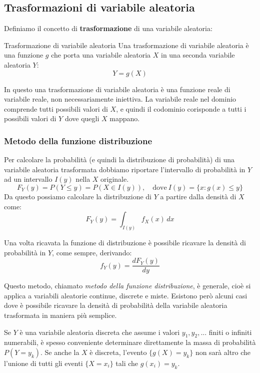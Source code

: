 \documentclass[a4paper,11pt]{article}
\begin{document}
\subsection{Trasformazioni di variabile aleatoria}
Definiamo il concetto di \textbf{trasformazione} di una variabile aleatoria:
\begin{definition}{Trasformazione di variabile aleatoria}
Una trasformazione di variabile aleatoria è una funzione $g$ che porta una variabile aleatoria $X$ in una seconda variabile aleatoria $Y$:
$$
Y = g(X)
$$
\end{definition}

In questo una trasformazione di variabile aleatoria è una funzione reale di variabile reale, non necessariamente iniettiva. La variabile reale nel dominio comprende tutti possibili valori di $X$, e quindi il codominio corisponde a tutti i possibili valori di $Y$ dove quegli $X$ mappano. 

\subsubsection{Metodo della funzione distribuzione}

Per calcolare la probabilità (e quindi la distribuzione di probabilità) di una variabile aleatoria trasformata dobbiamo riportare l'intervallo di probabilità in $Y$ ad un intervallo $I(y)$ nella $X$ originale.
$$
F_Y(y) = P(Y \leq y) = P(X \in I(y)), \quad \text{dove} \ I(y) = \{ x: g(x) \leq y \}
$$
Da questo possiamo calcolare la distribuzione di $Y$ a partire dalla densità di $X$ come:
$$
F_Y(y) = \int_{I(y)} f_X(x) \, dx
$$

Una volta ricavata la funzione di distribuzione è possibile ricavare la densità di probabilità in $Y$, come sempre, derivando:
$$
f_Y(y) = \frac{d F_Y(y)}{dy}
$$

Questo metodo, chiamato \textit{metodo della funzione distribuzione}, è generale, cioè si applica a variabili aleatorie continue, discrete e miste. Esistono però alcuni casi dove è possibile ricavare la densità di probabilità della variabile aleatoria trasformata in maniera più semplice.

\par\smallskip

Se $Y$ è una variabile aleatoria discreta che assume i valori $y_1, y_2, ...$ finiti o infiniti numerabili, è spesso conveniente determinare direttamente la massa di probabilità $P(Y = y_k)$. Se anche la $X$ è discreta, l'evento $\{g(X) = y_k\}$ non sarà altro che l'unione di tutti gli eventi $\{X = x_i\}$ tali che $g(x_i) = y_k$.
\end{document}
